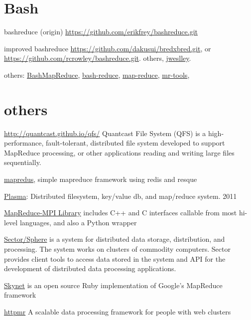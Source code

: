 \documentclass[letter,11pt,onecolumn]{book}
\begin{document}
\section{Bash}

bashreduce (origin) \url{https://github.com/erikfrey/bashreduce.git}

improved bashreduce \url{https://github.com/dakusui/bredxbred.git},
or \url{https://github.com/rcrowley/bashreduce.git}. others, \href{https://github.com/jweslley/bashreduce.git}{jweslley}.



others:
\href{https://github.com/jasonMatney/BashMapReduce.git}{BashMapReduce},
\href{https://github.com/sorhus/bash-reduce.git}{bash-reduce},
\href{https://github.com/colestanfield/map-reduce.git}{map-reduce},
\href{https://github.com/argent0/mr-tools.git}{mr-tools},


\section{others}



\url{http://quantcast.github.io/qfs/}
Quantcast File System (QFS) is a high-performance, fault-tolerant, distributed file system developed to support MapReduce processing, or other applications reading and writing large files sequentially.

\href{https://rubygems.org/gems/mapredus}{mapredus}, simple mapreduce framework using redis and resque

\href{http://projects.camlcity.org/projects/plasma.html}{Plasma}: Distributed filesystem, key/value db, and map/reduce system. 2011


\href{http://mapreduce.sandia.gov/}{MapReduce-MPI Library} includes C++ and C interfaces callable from most hi-level languages, and also a Python wrapper


\href{http://sector.sourceforge.net/}{Sector/Sphere} is a system for distributed data storage, distribution, and processing. The system works on clusters of commodity computers. Sector provides client tools to access data stored in the system and API for the development of distributed data processing applications.

\href{http://skynet.rubyforge.org/}{Skynet} is an open source Ruby implementation of Google’s MapReduce framework


\href{https://code.google.com/p/httpmr/}{httpmr} A scalable data processing framework for people with web clusters
\end{document}
